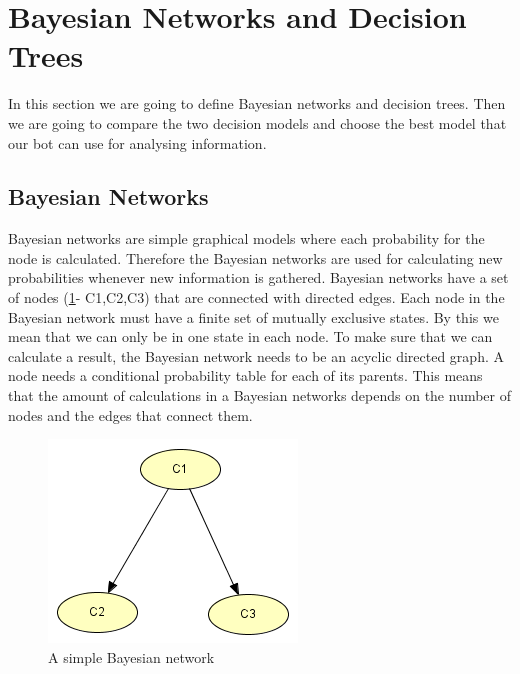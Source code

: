 \section{Bayesian Networks and Decision Trees}
In this section we are going to define Bayesian networks and decision trees. Then we are going to compare the two decision models and choose the best model that our bot can use for analysing information.

\subsection{Bayesian Networks}
	Bayesian networks are simple graphical models where each probability for the node is calculated. Therefore the Bayesian networks are used for calculating new probabilities whenever new information is gathered. Bayesian networks have a set of nodes (\ref{fig:basicbayesian}- C1,C2,C3) that are connected with directed edges. Each node in the Bayesian network must have a finite set of mutually exclusive states. By this we mean that we can only be in one state in each node. To make sure that we can calculate a result, the Bayesian network needs to be an acyclic directed graph. A node needs a conditional probability table for each of its parents. This means that the amount of calculations in a Bayesian networks depends on the number of nodes and the edges that connect them. \cite[p. 33]{Bayesian_Network_Design}
	
\begin{figure}[H]
\includegraphics{Figures/BayesianPictures/BasicBayesianNetwork.png}
\caption{A simple Bayesian network}
\label{fig:basicbayesian}
\end{figure}


